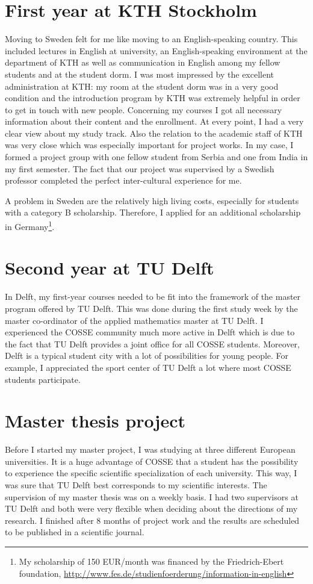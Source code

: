 \documentclass{article}
\begin{document}
\section*{First year at KTH Stockholm}
Moving to Sweden felt for me like moving to an English-speaking country. This included lectures in English at university, an English-speaking environment at the department of KTH as well as communication in English among my fellow students and at the student dorm. I was most impressed by the excellent administration at KTH: my room at the student dorm was in a very good condition and the introduction program by KTH was extremely helpful in order to get in touch with new people. Concerning my courses I got all necessary information about their content and the enrollment. At every point, I had a very clear view about my study track. Also the relation to the academic staff of KTH was very close which was especially important for project works. In my case, I formed a project group with one fellow student from Serbia and one from India in my first semester. The fact that our project was supervised by a Swedish professor completed the perfect inter-cultural experience for me.

A problem in Sweden are the relatively high living costs, especially for students with a category B scholarship. Therefore, I applied for an additional scholarship in Germany\footnote{My scholarship of 150 EUR/month was financed by the Friedrich-Ebert foundation, \url{http://www.fes.de/studienfoerderung/information-in-english}}. 
\section*{Second year at TU Delft}
In Delft, my first-year courses needed to be fit into the framework of the master program offered by TU Delft. This was done during the first study week by the master co-ordinator of the applied mathematics master at TU Delft. I experienced the COSSE community much more active in Delft which is due to the fact that TU Delft provides a joint office for all COSSE students. Moreover, Delft is a typical student city with a lot of possibilities for young people. For example, I appreciated the sport center of TU Delft a lot where most COSSE students participate.
\section*{Master thesis project}
Before I started my master project, I was studying at three different European universities. It is a huge advantage of COSSE that a student has the possibility to experience the specific scientific specialization of each university. This way, I was sure that TU Delft best corresponds to my scientific interests. The supervision of my master thesis was on a weekly basis. I had two supervisors at TU Delft and both were very flexible when deciding about the directions of my research. I finished after 8 months of project work and the results are scheduled to be published in a scientific journal.
\end{document}
